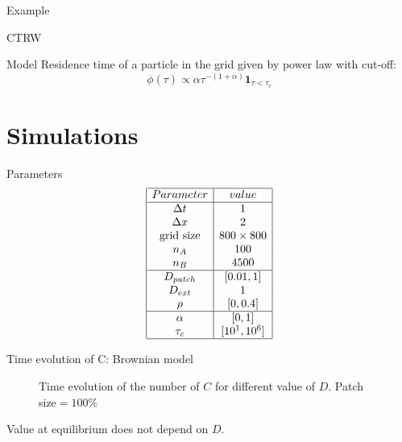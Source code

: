 \documentclass{beamer}
\begin{document}
\begin{frame}
\begin{center}
\Huge \color{blue} Example
\end{center}
\end{frame}

\begin{frame}{CTRW}
\begin{block}{Model}
Residence time of a particle in the grid given by power law with cut-off: 
$$ \phi(\tau) \propto \alpha \tau^{-(1+\alpha)} \mathbf{1}_{\tau < \tau_c}$$
\end{block}

\end{frame}


\section{Simulations}

\begin{frame}{Parameters}
$$
\begin{array}{|c|c|}
\hline
Parameter & value \\
\hline
\Delta t & 1 \\
\Delta x & 2 \\
\text{grid size} & 800 \times 800 \\
n_A & 100 \\
n_B & 4500 \\
\hline
D_{patch} & [0.01, 1] \\
D_{ext} & 1 \\
\rho & [0, 0.4] \\
\hline
\alpha & [0,1] \\
\tau_c & [10^1, 10^6] \\
\hline
\end{array}
$$
\end{frame}

\begin{frame}{Time evolution of C: Brownian model}

\begin{figure}
\caption{Time evolution of the number of $C$ for different value of $D$. Patch size$=100\%$}
\end{figure}
Value at equilibrium does not depend on $D$.
\end{frame}
\end{document}

